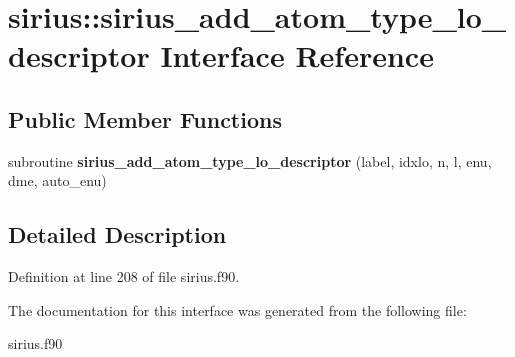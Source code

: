 \hypertarget{interfacesirius_1_1sirius__add__atom__type__lo__descriptor}{}\section{sirius\+:\+:sirius\+\_\+add\+\_\+atom\+\_\+type\+\_\+lo\+\_\+descriptor Interface Reference}
\label{interfacesirius_1_1sirius__add__atom__type__lo__descriptor}
\subsection*{Public Member Functions}
\begin{DoxyCompactItemize}
\item 
\hypertarget{interfacesirius_1_1sirius__add__atom__type__lo__descriptor_ae366dff33936c534f051513edd1e7c28}{}subroutine {\bfseries sirius\+\_\+add\+\_\+atom\+\_\+type\+\_\+lo\+\_\+descriptor} (label, idxlo, n, l, enu, dme, auto\+\_\+enu)\label{interfacesirius_1_1sirius__add__atom__type__lo__descriptor_ae366dff33936c534f051513edd1e7c28}

\end{DoxyCompactItemize}


\subsection{Detailed Description}


Definition at line 208 of file sirius.\+f90.



The documentation for this interface was generated from the following file\+:\begin{DoxyCompactItemize}
\item 
sirius.\+f90\end{DoxyCompactItemize}
